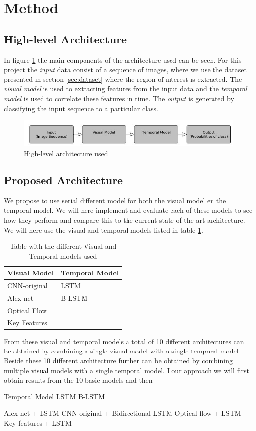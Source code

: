 \section{Method}
\label{sec:method}

\subsection{High-level Architecture}
In figure \ref{fig:highLevelArchitecture} the main components of the architecture used can be seen.
For this project the \textit{input} data consist of a sequence of images, where we use the dataset presented in section \ref{sec:dataset} where the region-of-interest is extracted.
The \textit{visual model} is used to extracting features from the input data and the \textit{temporal model} is used to correlate these features in time.
The \textit{output} is generated by classifying the input sequence to a particular class.

\begin{figure}
    \centering
    \includegraphics[width=\columnwidth]{fig/highLevelArchitecture.jpg}
    \caption{High-level architecture used}
    \label{fig:highLevelArchitecture}
\end{figure}

\subsection{Proposed Architecture}
We propose to use serial different model for both the visual model en the temporal model.
We will here implement and evaluate each of these models to see how they perform and compare this to the current state-of-the-art architecture.
We will here use the visual and temporal models listed in table \ref{tab:visualTemporalModel}.

\begin{table}
\centering
\begin{tabular}{l|l}
Visual Model & Temporal Model\\
\hline
CNN-original & LSTM\\
Alex-net & B-LSTM\\
Optical Flow & \\
Key Features &
\end{tabular}
\caption{Table with the different Visual and Temporal models used}
\label{tab:visualTemporalModel}
\end{table}

From these visual and temporal models a total of 10 different architectures can be obtained by combining a single visual model with a single temporal model.
Beside these 10 different architecture further can be obtained by combining multiple visual models with a single temporal model.
I our approach we will first obtain results from the 10 basic models and then 


Temporal Model
LSTM
B-LSTM


Alex-net + LSTM
CNN-original + Bidirectional LSTM
Optical flow + LSTM
Key features + LSTM


